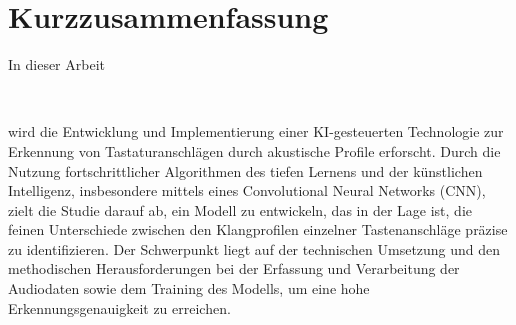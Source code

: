 
\chapter*{Kurzzusammenfassung}

In dieser Arbeit
\begin{center} \titleemph{\workTitel} \\ \end{center}
wird die Entwicklung und Implementierung einer KI-gesteuerten Technologie zur Erkennung von Tastaturanschlägen durch akustische Profile erforscht. Durch die Nutzung fortschrittlicher Algorithmen des tiefen Lernens und der künstlichen Intelligenz, insbesondere mittels eines Convolutional Neural Networks (CNN), zielt die Studie darauf ab, ein Modell zu entwickeln, das in der Lage ist, die feinen Unterschiede zwischen den Klangprofilen einzelner Tastenanschläge präzise zu identifizieren. Der Schwerpunkt liegt auf der technischen Umsetzung und den methodischen Herausforderungen bei der Erfassung und Verarbeitung der Audiodaten sowie dem Training des Modells, um eine hohe Erkennungsgenauigkeit zu erreichen.


